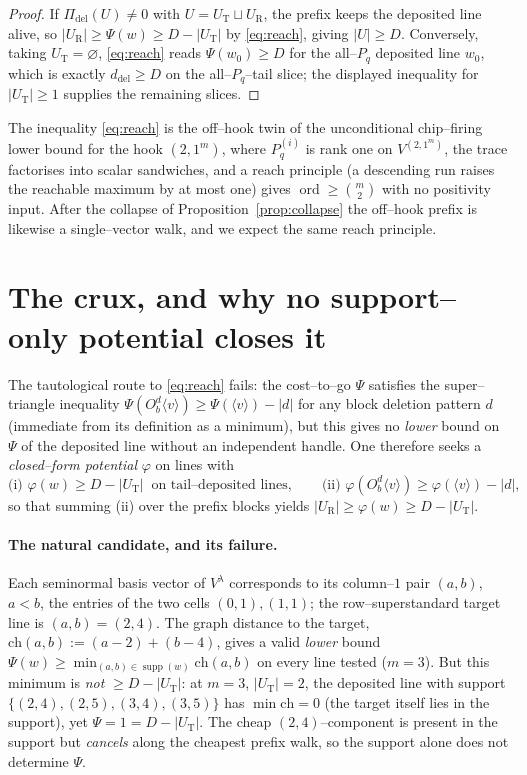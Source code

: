 \documentclass[11pt]{article}
\theoremstyle{definition}
\DeclareMathOperator{\supp}{supp}
\DeclareMathOperator{\ord}{ord}
\newcommand{\Vlam}{V^\lambda}
\newcommand{\Pq}{P_{q}}
\newcommand{\Pdel}{\Pi_{\mathrm{del}}}
\newcommand{\ddel}{d_{\mathrm{del}}}
\begin{document}
\begin{proof}
If $\Pdel(U)\neq0$ with $U=U_{\mathrm T}\sqcup U_{\mathrm R}$, the prefix keeps the deposited line
alive, so $|U_{\mathrm R}|\ge\Psi(w)\ge D-|U_{\mathrm T}|$ by \eqref{eq:reach}, giving
$|U|\ge D$. Conversely, taking $U_{\mathrm T}=\varnothing$, \eqref{eq:reach} reads
$\Psi(w_0)\ge D$ for the all--$\Pq$ deposited line $w_0$, which is exactly $\ddel\ge D$ on the
all--$\Pq$--tail slice; the displayed inequality for $|U_{\mathrm T}|\ge1$ supplies the
remaining slices.
\end{proof}

\noindent The inequality \eqref{eq:reach} is the off--hook twin of the unconditional chip--firing
lower bound for the hook $(2,1^m)$, where $\Pq^{(i)}$ is rank one on $V^{(2,1^m)}$, the trace
factorises into scalar sandwiches, and a reach principle (a descending run raises the reachable
maximum by at most one) gives $\ord\ge\binom m2$ with no positivity input. After the collapse of
Proposition~\ref{prop:collapse} the off--hook prefix is likewise a single--vector walk, and we
expect the same reach principle.

\section{The crux, and why no support--only potential closes it}\label{sec:crux}

The tautological route to \eqref{eq:reach} fails: the cost--to--go $\Psi$ satisfies the
super--triangle inequality $\Psi(O_b^d\langle v\rangle)\ge\Psi(\langle v\rangle)-|d|$ for any
block deletion pattern $d$ (immediate from its definition as a minimum), but this gives no
\emph{lower} bound on $\Psi$ of the deposited line without an independent handle. One therefore
seeks a \emph{closed--form potential} $\varphi$ on lines with
\[
   \text{(i) } \varphi(w)\ge D-|U_{\mathrm T}|\ \text{ on tail--deposited lines},\qquad
   \text{(ii) } \varphi(O_b^d\langle v\rangle)\ge\varphi(\langle v\rangle)-|d| ,
\]
so that summing (ii) over the prefix blocks yields $|U_{\mathrm R}|\ge\varphi(w)\ge
D-|U_{\mathrm T}|$.

\paragraph{The natural candidate, and its failure.} Each seminormal basis vector of $\Vlam$
corresponds to its column--$1$ pair $(a,b)$, $a<b$, the entries of the two cells $(0,1),(1,1)$;
the row--superstandard target line is $(a,b)=(2,4)$. The graph distance to the target,
$\mathrm{ch}(a,b):=(a-2)+(b-4)$, gives a valid \emph{lower} bound
$\Psi(w)\ge\min_{(a,b)\in\supp(w)}\mathrm{ch}(a,b)$ on every line tested ($m=3$). But this
minimum is \emph{not} $\ge D-|U_{\mathrm T}|$: at $m=3$, $|U_{\mathrm T}|=2$, the deposited line
with support $\{(2,4),(2,5),(3,4),(3,5)\}$ has $\min\mathrm{ch}=0$ (the target itself lies in the
support), yet $\Psi=1=D-|U_{\mathrm T}|$. The cheap $(2,4)$--component is present in the support
but \emph{cancels} along the cheapest prefix walk, so the support alone does not determine
$\Psi$.
\end{document}
